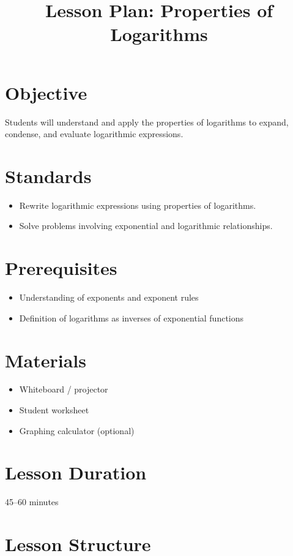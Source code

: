 \documentclass[10pt]{article}
\title{Lesson Plan: Properties of Logarithms}
\author{}
\date{}
\begin{document}
\maketitle

\section*{Objective}
Students will understand and apply the properties of logarithms to expand, condense, and evaluate logarithmic expressions.

\section*{Standards}
\begin{itemize}
    \item Rewrite logarithmic expressions using properties of logarithms.
    \item Solve problems involving exponential and logarithmic relationships.
\end{itemize}

\section*{Prerequisites}
\begin{itemize}
    \item Understanding of exponents and exponent rules
    \item Definition of logarithms as inverses of exponential functions
\end{itemize}

\section*{Materials}
\begin{itemize}
    \item Whiteboard / projector
    \item Student worksheet
    \item Graphing calculator (optional)
\end{itemize}

\section*{Lesson Duration}
45--60 minutes

\section*{Lesson Structure}
\end{document}

